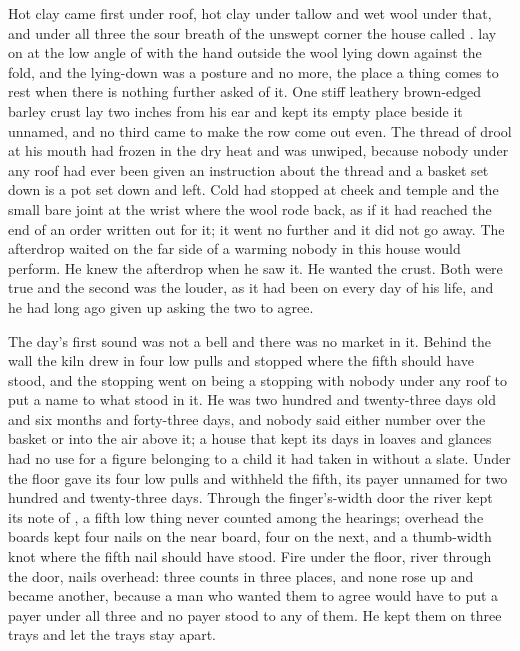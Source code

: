 
Hot clay came first under  roof, hot clay under tallow and wet wool under that, and under all three the sour  breath of the unswept corner the house called .  lay on  at the low angle of  with the hand outside the wool lying down against the fold, and the lying-down was a posture and no more, the place a thing comes to rest when there is nothing further asked of it. One stiff leathery brown-edged barley crust lay two inches from his ear and kept its empty place beside it unnamed, and no third came to make the row come out even. The thread of drool at his mouth had frozen in the dry heat and was unwiped, because nobody under any roof had ever been given an instruction about the thread and a basket set down is a pot set down and left. Cold had stopped at cheek and temple and the small bare joint at the wrist where the wool rode back, as if it had reached the end of an order written out for it; it went no further and it did not go away. The afterdrop waited on the far side of a warming nobody in this house would perform. He knew the afterdrop when he saw it. He wanted the crust. Both were true and the second was the louder, as it had been on every day of his life, and he had long ago given up asking the two to agree.

The day's first sound was not a bell and there was no market in it. Behind the wall the kiln drew in four low pulls and stopped where the fifth should have stood, and the stopping went on being a stopping with nobody under any roof to put a name to what stood in it. He was two hundred and twenty-three days old and six months and forty-three days, and nobody said either number over the basket or into the air above it; a house that kept its days in loaves and glances had no use for a figure belonging to a child it had taken in without a slate. Under the floor  gave its four low pulls and withheld the fifth, its payer unnamed for two hundred and twenty-three days. Through the finger's-width door the river kept its note of , a fifth low thing never counted among the hearings; overhead the boards kept four nails on the near board, four on the next, and a thumb-width knot where the fifth nail should have stood. Fire under the floor, river through the door, nails overhead: three counts in three places, and none rose up and became another, because a man who wanted them to agree would have to put a payer under all three and no payer stood to any of them. He kept them on three trays and let the trays stay apart.

